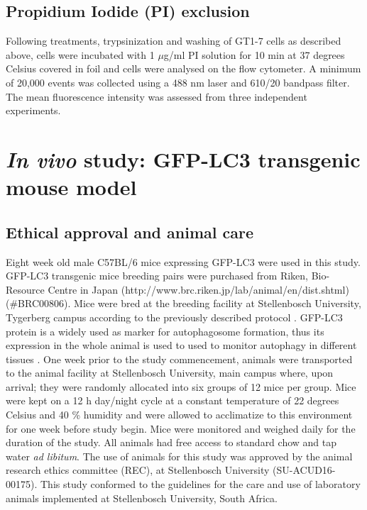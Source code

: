 \subsection{Propidium Iodide (PI) exclusion}
Following treatments, trypsinization and washing of  GT1-7 cells as described above, cells were incubated with 1 $\mu$g/ml PI solution for 10 min at 37 degrees Celsius covered in foil and cells were analysed on the flow cytometer. A minimum of 20,000 events was collected using a 488 nm laser and 610/20 bandpass filter. The mean fluorescence intensity was assessed from three independent experiments. 

\section{\textit{In vivo} study: GFP-LC3 transgenic mouse model}
\subsection{Ethical approval and animal care}
Eight week old male C57BL/6 mice expressing GFP-LC3 were used in this study. GFP-LC3 transgenic mice breeding pairs were purchased from Riken, Bio-Resource Centre in Japan (http://www.brc.riken.jp/lab/animal/en/dist.shtml) (\#BRC00806). Mice were bred at the breeding facility at Stellenbosch University, Tygerberg campus according to the previously described protocol \citep{Mizushima2009,Mizushima2004a}. GFP-LC3 protein is a widely used as marker for autophagosome formation, thus its expression in the whole animal is used to used to monitor autophagy in different tissues \citep{Mizushima2009}. One week prior to the study commencement, animals were transported to the animal facility at Stellenbosch University, main campus where, upon arrival; they were randomly allocated into six groups of 12 mice per group. Mice were kept on a 12 h day/night cycle at a constant temperature of 22 degrees Celsius and 40 \% humidity and were allowed to acclimatize to this environment for one week before study begin. Mice were monitored and weighed daily for the duration of the study. All animals had free access to standard chow and tap water \textit{ad libitum}. The use of animals for this study was approved by the animal research ethics committee (REC), at Stellenbosch University (SU-ACUD16-00175). This study conformed to the guidelines for the care and use of laboratory animals implemented at Stellenbosch University, South Africa.

